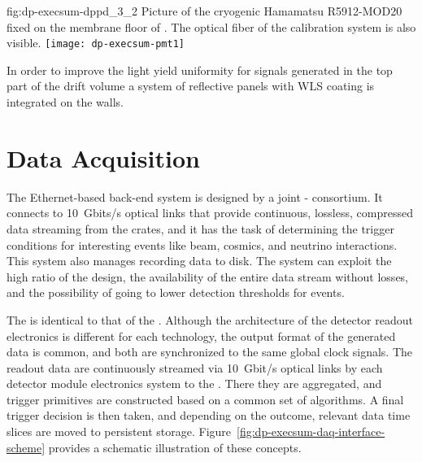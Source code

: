 \begin{dunefigure}{fig:dp-execsum-dppd_3_2}
{Picture of the cryogenic Hamamatsu R5912-MOD20  fixed on the membrane floor of . The optical fiber of the calibration system is also visible.}
\texttt{[image: dp-execsum-pmt1]}
\end{dunefigure}

In order to improve the light yield uniformity for signals generated in the top part of the drift volume a system of reflective panels with WLS coating is integrated on the   walls.


\section{Data Acquisition}
\label{sec:dp-execsum-daq}

The Ethernet-based  back-end system is designed by a joint - consortium. It connects to 
\SI{10}{Gbits/s} optical links that provide continuous, lossless, compressed data streaming from the  crates, and it has the task of determining the trigger conditions for interesting events like beam, cosmics, and  neutrino interactions. This system also manages recording data to disk. The system can exploit the high  ratio of the  design, the availability of the entire data stream without losses, and the possibility of going to lower detection thresholds for  events.

The   is identical to that of the . %
Although the architecture of the detector readout electronics is different for each technology, the output format of the generated data is common, and both are synchronized to the same global clock signals. The readout data are continuously streamed via \SI{10}{Gbit/s}  optical links by each detector module  electronics system to the . There they are aggregated, and trigger primitives are constructed based on a common set of algorithms. A final trigger decision is then taken, and depending on the outcome, relevant data time slices are moved to persistent storage. Figure~\ref{fig:dp-execsum-daq-interface-scheme} provides a schematic illustration of these concepts.
  

